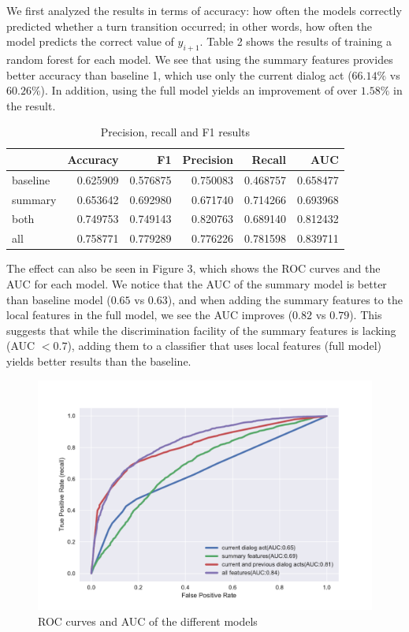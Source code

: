 We first analyzed the results in terms of accuracy: how often the models correctly predicted whether a turn transition occurred; in other words, how often the model predicts the correct value of $y_{i+1}$.
%
Table 2 shows the results of training a random forest for each model.
We see that using the summary features provides better accuracy than baseline 1, which use only the current dialog act ($66.14\%$ vs $60.26\%$). In addition, using the full model yields an improvement of over $1.58\%$ in the result.
%
\begin{table}[ht!]
\begin{center}
\begin{tabular}{lrrrrr}
\toprule
{} &  Accuracy &        F1 &  Precision &    Recall &   AUC \\
\midrule
baseline &  0.625909 &  0.576875 &   0.750083 &  0.468757 &  0.658477 \\
summary  &  0.653642 &  0.692980 &   0.671740 &  0.714266 &  0.693968 \\
both     &  0.749753 &  0.749143 &   0.820763 &  0.689140 &  0.812432 \\
all      &  0.758771 &  0.779289 &   0.776226 &  0.781598 &  0.839711 \\
\bottomrule
\end{tabular}
\end{center}
\caption{Precision, recall and F1 results }
\end{table}


The effect can also be seen in Figure 3, which shows the ROC curves and the AUC for each
model. We notice that the AUC of the summary model is better than baseline model ($0.65$ vs $0.63$), and when adding the summary features to the local features in the full model, we see the AUC improves ($0.82$ vs $0.79$). This suggests that while the discrimination facility of the summary features is lacking (AUC $<0.7$), adding them to a classifier that uses local features (full model) yields better results than the baseline.
%
 \begin{figure}[ht!]
 \centering
 \includegraphics[width=\textwidth]{../scikitlearn/figures/roc.pdf}\vspace{-1.5em}
 \caption{ROC curves and AUC of the different models \label{overflow}}
 \end{figure}

